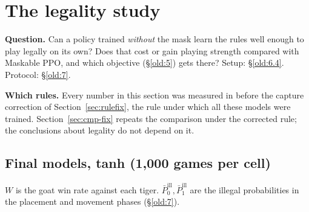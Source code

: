 \section{The legality study}\label{old:9}

\textbf{Question.} Can a policy trained \emph{without} the mask learn the rules well enough to play legally on its own? Does that cost or gain playing strength compared with Maskable PPO, and which objective (\S\ref{old:5}) gets there? Setup: \S\ref{old:6.4}. Protocol: \S\ref{old:7}.

\textbf{Which rules.} Every number in this section was measured in  before the capture correction of Section~\ref{sec:rulefix}, the rule under which all these models were trained. Section~\ref{sec:cmp-fix} repeats the comparison under the corrected rule; the conclusions about legality do not depend on it.

\subsection{Final models, tanh (1,000 games per cell)}\label{old:9.1}

$W$ is the goat win rate against each tiger. $\bar P^{\text{ill}}_0, \bar P^{\text{ill}}_1$ are the illegal probabilities in the placement and movement phases (\S\ref{old:7}).

